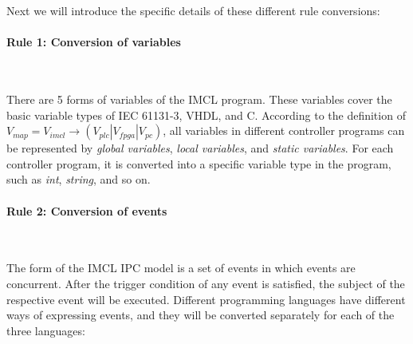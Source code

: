 Next we will introduce the specific details of these different rule conversions:




\paragraph{\textbf{Rule 1: Conversion of variables}} \

There are 5 forms of variables of the IMCL program. These variables cover the basic variable types of IEC 61131-3, VHDL, and C. According to the definition of$V_{map} = V_{imcl} \rightarrow (V_{plc} | V_{fpga}| V_{pc})$, all variables in different controller programs can be represented by \emph{global variables}, \emph{local variables}, and \emph{static variables}. For each controller program, it is converted into a specific variable type in the program, such as \emph{int}, \emph{string}, and so on.

\paragraph{\textbf{Rule 2: Conversion of events}} \

The form of the IMCL IPC model is a set of events in which events are concurrent. After the trigger condition of any event is satisfied, the subject of the respective event will be executed. Different programming languages have different ways of expressing events, and they will be converted separately for each of the three languages:

